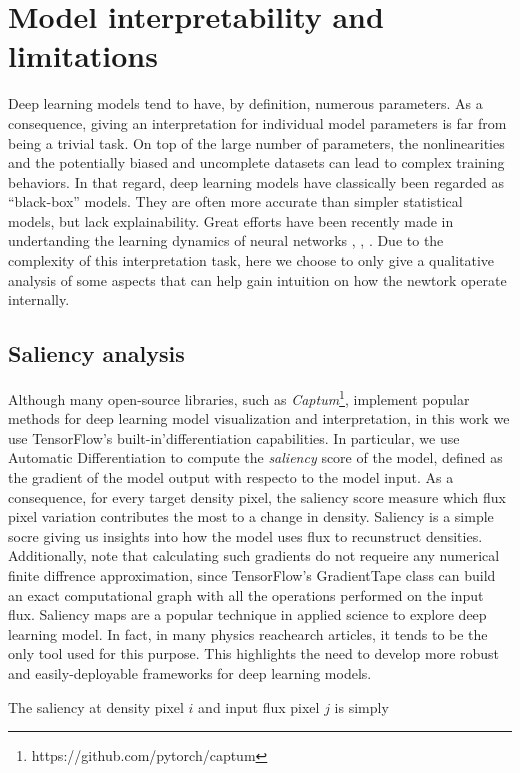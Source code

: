 \section{Model interpretability and limitations}
Deep learning models tend to have, by definition, numerous parameters. As a consequence, giving an interpretation for individual model parameters is far from being a trivial task. On top of the large number of parameters, the nonlinearities and the potentially biased and uncomplete datasets can lead to complex training behaviors. In that regard, deep learning models have classically been regarded as ``black-box'' models. They are often more accurate than simpler statistical models, but lack explainability. Great efforts have been recently made in undertanding the learning dynamics of neural networks \cite{shwartzziv2017opening}, \cite{buhrmester2019analysis}, \cite{explaiNN}.
Due to the complexity of this interpretation task, here we choose to only give a qualitative analysis of some aspects that can help gain intuition on how the newtork operate internally.

\subsection{Saliency analysis}
Although many open-source libraries, such as \textit{Captum}\footnote{https://github.com/pytorch/captum}, implement popular methods for deep learning model visualization and interpretation, in this work we use TensorFlow's built-in'differentiation capabilities. In particular, we use Automatic Differentiation to compute the \textit{saliency} score of the model, defined as the gradient of the model output with respecto to the model input. As a consequence, for every target density pixel, the saliency score measure which flux pixel variation contributes the most to a change in density. Saliency is a simple socre giving us insights into how the model uses flux to recunstruct densities. Additionally, note that calculating such gradients do not requeire any numerical finite diffrence approximation, since TensorFlow's GradientTape class can build an exact computational graph with all the operations performed on the input flux. Saliency maps are a popular technique in applied science to explore deep learning model. In fact, in many physics reachearch articles, it tends to be the only tool used for this purpose. This highlights the need to develop more robust and easily-deployable frameworks for deep learning models.

The saliency at density pixel $i$ and input flux pixel $j$ is simply

